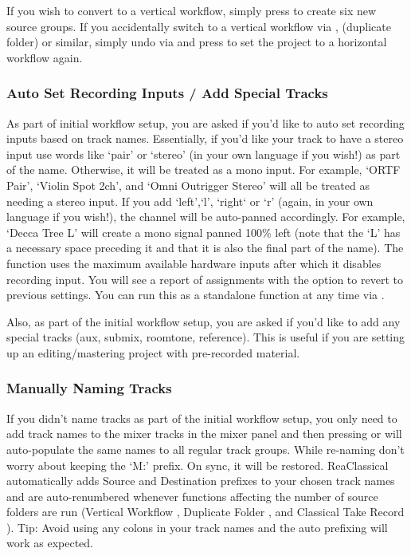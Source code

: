 \documentclass[10pt,american]{article}
\begin{document}
If you wish to convert to a vertical workflow, simply press  to create
six new source groups. If you accidentally switch to a vertical workflow via
, \keys{\textbackslash} (duplicate folder) or similar, simply undo via
 and press  to set the project to a horizontal workflow
again.

\subsubsection{Auto Set Recording Inputs / Add Special Tracks}

As part of initial workflow setup, you are asked if you'd like to auto set
recording inputs based on track names. Essentially, if you'd like your track to
have a stereo input use words like `pair' or `stereo' (in your own language if
you wish!) as part of the name. Otherwise, it will be treated as a mono input.
For example, `ORTF Pair', `Violin Spot 2ch', and `Omni Outrigger Stereo' will
all be treated as needing a stereo input. If you add `left',`l', `right` or `r'
(again, in your own language if you wish!), the channel will be auto-panned
accordingly. For example, `Decca Tree L' will create a mono signal panned 100\% left
(note that the `L' has a necessary space preceding it and that it is also the
final part of the name). The function uses the maximum available hardware inputs
after which it disables recording input. You will see a report of assignments
with the option to revert to previous settings. You can run this as a standalone
function at any time via .

Also, as part of the initial workflow setup, you are asked if you'd like to add
any special tracks (aux, submix, roomtone, reference). This is useful if you are
setting up an editing/mastering project with pre-recorded material.

\subsubsection{Manually Naming Tracks }

If you didn't name tracks as part of the initial workflow setup, you only need
to add track names to the mixer tracks in the mixer panel and then pressing
 or  will auto-populate the same names to all regular track
groups. While re-naming don't worry about keeping the `M:' prefix. On sync, it
will be restored. ReaClassical automatically adds Source and Destination
prefixes to your chosen track names and are auto-renumbered whenever functions
affecting the number of source folders are run (Vertical Workflow ,
Duplicate Folder \keys{\textbackslash}, and Classical Take Record ).
Tip: Avoid using any colons in your track names and the auto prefixing will work
as expected. 
\end{document}
